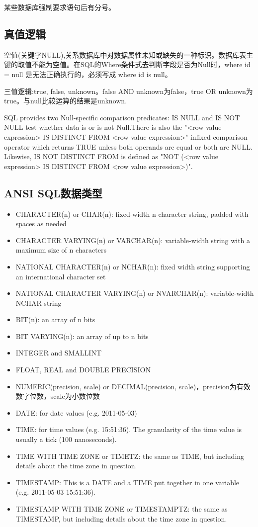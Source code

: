 某些数据库强制要求语句后有分号。

\subsection{真值逻辑}

空值(关键字NULL),关系数据库中对数据属性未知或缺失的一种标识。数据库表主键的取值不能为空值。在SQL的Where条件式去判断字段是否为Null时，where id = null 是无法正确执行的，必须写成 where id is null。

三值逻辑:true, false, unknown。false AND unknown为false，true OR unknown为true。与null比较运算的结果是unknown.

SQL provides two Null-specific comparison predicates: IS NULL and IS NOT NULL test whether data is or is not Null.There is also the "<row value expression> IS DISTINCT FROM <row value expression>" infixed comparison operator which returns TRUE unless both operands are equal or both are NULL. Likewise, IS NOT DISTINCT FROM is defined as "NOT (<row value expression> IS DISTINCT FROM <row value expression>)".


\subsection{ANSI SQL数据类型}
\begin{itemize}
   \item 
 CHARACTER(n) or CHAR(n): fixed-width n-character string, padded with spaces as needed
   \item 
CHARACTER VARYING(n) or VARCHAR(n): variable-width string with a maximum size of n characters
   \item 
NATIONAL CHARACTER(n) or NCHAR(n): fixed width string supporting an international character set
   \item 
NATIONAL CHARACTER VARYING(n) or NVARCHAR(n): variable-width NCHAR string
   \item 
BIT(n): an array of n bits
   \item 
BIT VARYING(n): an array of up to n bits
   \item 
INTEGER and SMALLINT
   \item 
FLOAT, REAL and DOUBLE PRECISION
   \item 
NUMERIC(precision, scale) or DECIMAL(precision, scale)，precision为有效数字位数，scale为小数位数
   \item 
DATE: for date values (e.g. 2011-05-03)
   \item 
TIME: for time values (e.g. 15:51:36). The granularity of the time value is usually a tick (100 nanoseconds).
   \item 
TIME WITH TIME ZONE or TIMETZ: the same as TIME, but including details about the time zone in question.
   \item 
TIMESTAMP: This is a DATE and a TIME put together in one variable (e.g. 2011-05-03 15:51:36).
   \item 
TIMESTAMP WITH TIME ZONE or TIMESTAMPTZ: the same as TIMESTAMP, but including details about the time zone in question.
\end{itemize}





